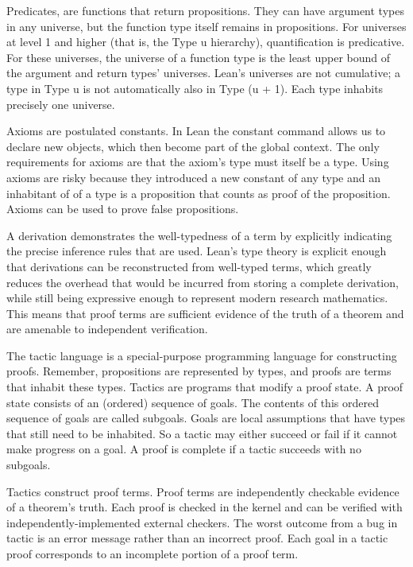\documentclass{article}
\begin{document}
Predicates, are functions that return propositions. They can have argument types in any universe, but the function type itself remains in propositions. For universes at level 1 and higher (that is, the Type u hierarchy), quantification is predicative. For these universes, the universe of a function type is the least upper bound of the argument and return types' universes. Lean's universes are not cumulative; a type in Type u is not automatically also in Type (u + 1). Each type inhabits precisely one universe.

Axioms are postulated constants. In Lean the constant command allows us to declare new objects, which then become part of the global context. The only requirements for axioms are that the axiom’s type must itself be a type. Using axioms are risky because they introduced a new constant of any type and an inhabitant of of a type is a proposition that counts as proof of the proposition. Axioms can be used to prove false propositions. 

A derivation demonstrates the well-typedness of a term by explicitly indicating the precise inference rules that are used. Lean's type theory is explicit enough that derivations can be reconstructed from well-typed terms, which greatly reduces the overhead that would be incurred from storing a complete derivation, while still being expressive enough to represent modern research mathematics. This means that proof terms are sufficient evidence of the truth of a theorem and are amenable to independent verification.

The tactic language is a special-purpose programming language for constructing proofs. Remember, propositions are represented by types, and proofs are terms that inhabit these types. Tactics are programs that modify a proof state. A proof state consists of an (ordered) sequence of goals. The contents of this ordered sequence of goals are called subgoals. Goals are local assumptions that have types that still need to be inhabited. So a tactic may either succeed or fail if it cannot make progress on a goal. A proof is complete if a tactic succeeds with no subgoals.  

Tactics construct proof terms. Proof terms are independently checkable evidence of a theorem’s truth. Each proof is checked in the kernel and can be verified with independently-implemented external checkers. The worst outcome from a bug in tactic is an error message rather than an incorrect proof. Each goal in a tactic proof corresponds to an incomplete portion of a proof term. 
\end{document}
